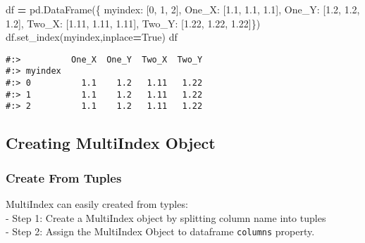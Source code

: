 \documentclass[
]{book}
\newenvironment{Shaded}{\begin{snugshade}}{\end{snugshade}}
\newcommand{\DecValTok}[1]{\textcolor[rgb]{0.06,0.06,0.06}{#1}}
\newcommand{\FloatTok}[1]{\textcolor[rgb]{0.06,0.06,0.06}{#1}}
\newcommand{\NormalTok}[1]{#1}
\newcommand{\OperatorTok}[1]{\textcolor[rgb]{0.43,0.43,0.43}{\textbf{#1}}}
\newcommand{\StringTok}[1]{\textcolor[rgb]{0.5,0.5,0.5}{#1}}
\newcommand{\VariableTok}[1]{\textcolor[rgb]{0,0,0}{#1}}
\begin{document}
\begin{Shaded}
\begin{Highlighting}[]
\NormalTok{df }\OperatorTok{=}\NormalTok{ pd.DataFrame(\{}
     \StringTok{\textquotesingle{}myindex\textquotesingle{}}\NormalTok{: [}\DecValTok{0}\NormalTok{, }\DecValTok{1}\NormalTok{, }\DecValTok{2}\NormalTok{],}
     \StringTok{\textquotesingle{}One\_X\textquotesingle{}}\NormalTok{:   [}\FloatTok{1.1}\NormalTok{,  }\FloatTok{1.1}\NormalTok{,  }\FloatTok{1.1}\NormalTok{],}
     \StringTok{\textquotesingle{}One\_Y\textquotesingle{}}\NormalTok{:   [}\FloatTok{1.2}\NormalTok{,  }\FloatTok{1.2}\NormalTok{,  }\FloatTok{1.2}\NormalTok{],}
     \StringTok{\textquotesingle{}Two\_X\textquotesingle{}}\NormalTok{:   [}\FloatTok{1.11}\NormalTok{, }\FloatTok{1.11}\NormalTok{, }\FloatTok{1.11}\NormalTok{],}
     \StringTok{\textquotesingle{}Two\_Y\textquotesingle{}}\NormalTok{:   [}\FloatTok{1.22}\NormalTok{, }\FloatTok{1.22}\NormalTok{, }\FloatTok{1.22}\NormalTok{]\})}
\NormalTok{df.set\_index(}\StringTok{\textquotesingle{}myindex\textquotesingle{}}\NormalTok{,inplace}\OperatorTok{=}\VariableTok{True}\NormalTok{)}
\NormalTok{df}
\end{Highlighting}
\end{Shaded}

\begin{verbatim}
#:>          One_X  One_Y  Two_X  Two_Y
#:> myindex                            
#:> 0          1.1    1.2   1.11   1.22
#:> 1          1.1    1.2   1.11   1.22
#:> 2          1.1    1.2   1.11   1.22
\end{verbatim}

\hypertarget{creating-multiindex-object}{%
\subsection{Creating MultiIndex Object}\label{creating-multiindex-object}}

\hypertarget{create-from-tuples}{%
\subsubsection{Create From Tuples}\label{create-from-tuples}}

MultiIndex can easily created from typles:\\
- Step 1: Create a MultiIndex object by splitting column name into tuples\\
- Step 2: Assign the MultiIndex Object to dataframe \texttt{columns} property.
\end{document}
